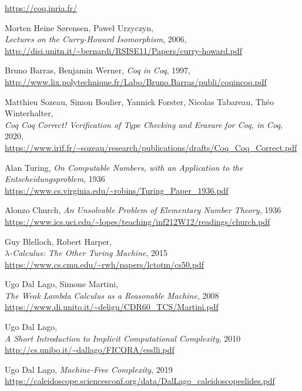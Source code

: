 \documentclass[declaration,mgr,english,shortabstract]{iithesis}
\begin{document}
\begin{thebibliography}{1}
    \url{https://coq.inria.fr/}

    Morten Heine Sørensen, Paweł Urzyczyn, \\
    \textit{Lectures on the Curry-Howard Isomorphism}, 2006, \\
    \url{http://disi.unitn.it/~bernardi/RSISE11/Papers/curry-howard.pdf}

    Bruno Barras, Benjamin Werner, \textit{Coq in Coq}, 1997, \\
    \url{http://www.lix.polytechnique.fr/Labo/Bruno.Barras/publi/coqincoq.pdf}

    Matthieu Sozeau, Simon Boulier, Yannick Forster, Nicolas Tabareau, Théo Winterhalter, \\
    \textit{Coq Coq Correct! Verification of Type Checking and Erasure for Coq, in Coq}, 2020, \\
    \url{https://www.irif.fr/~sozeau/research/publications/drafts/Coq_Coq_Correct.pdf}

    Alan Turing, \textit{On Computable Numbers, with an Application to the Entscheidungsproblem}, 1936 \\
    \url{https://www.cs.virginia.edu/~robins/Turing_Paper_1936.pdf}

    Alonzo Church, \textit{An Unsolvable Problem of Elementary Number Theory}, 1936 \\
    \url{https://www.ics.uci.edu/~lopes/teaching/inf212W12/readings/church.pdf}

    Guy Blelloch, Robert Harper, \\
    \textit{$\lambda$-Calculus: The Other Turing Machine}, 2015 \\
    \url{https://www.cs.cmu.edu/~rwh/papers/lctotm/cs50.pdf}

    Ugo Dal Lago, Simone Martini, \\
    \textit{The Weak Lambda Calculus
    as a Reasonable Machine}, 2008 \\
    \url{https://www.di.unito.it/~deligu/CDR60_TCS/Martini.pdf}

    Ugo Dal Lago, \\
    \textit{A Short Introduction
    to Implicit Computational Complexity}, 2010 \\
    \url{http://cs.unibo.it/~dallago/FICQRA/esslli.pdf}

    Ugo Dal Lago,
    \textit{Machine-Free Complexity},
    2019 \\
    \url{https://caleidoscope.sciencesconf.org/data/DalLago_caleidoscopeslides.pdf}


\end{thebibliography}
\end{document}
